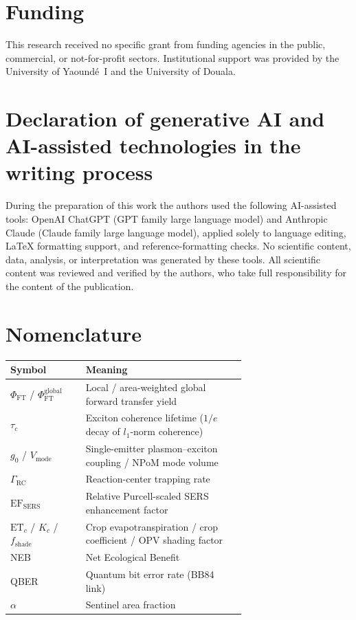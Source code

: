 \documentclass[preprint,12pt]{elsarticle}
\begin{document}
\section*{Funding}
This research received no specific grant from funding agencies in the public, commercial, or not-for-profit sectors. Institutional support was provided by the University of Yaound\'{e}~I and the University of Douala.

\section*{Declaration of generative AI and AI-assisted technologies in the writing process}
During the preparation of this work the authors used the following AI-assisted tools: OpenAI ChatGPT (GPT family large language model) and Anthropic Claude (Claude family large language model), applied solely to language editing, LaTeX formatting support, and reference-formatting checks. No scientific content, data, analysis, or interpretation was generated by these tools. All scientific content was reviewed and verified by the authors, who take full responsibility for the content of the publication.

\section*{Nomenclature}
\small
\begin{tabular}{@{}l p{0.68\linewidth}@{}}
\toprule
\textbf{Symbol} & \textbf{Meaning} \\
\midrule
$\Phi_{\mathrm{FT}}$ / $\Phi_{\mathrm{FT}}^{\mathrm{global}}$ & Local / area-weighted global forward transfer yield \\
$\tau_c$ & Exciton coherence lifetime ($1/e$ decay of $l_1$-norm coherence) \\
$g_0$ / $V_{\mathrm{mode}}$ & Single-emitter plasmon--exciton coupling / NPoM mode volume \\
$\Gamma_{\mathrm{RC}}$ & Reaction-center trapping rate \\
$\mathrm{EF}_{\mathrm{SERS}}$ & Relative Purcell-scaled SERS enhancement factor \\
$\mathrm{ET}_c$ / $K_c$ / $f_{\mathrm{shade}}$ & Crop evapotranspiration / crop coefficient / OPV shading factor \\
NEB & Net Ecological Benefit \\
QBER & Quantum bit error rate (BB84 link) \\
$\alpha$ & Sentinel area fraction \\
\bottomrule
\end{tabular}
\end{document}
